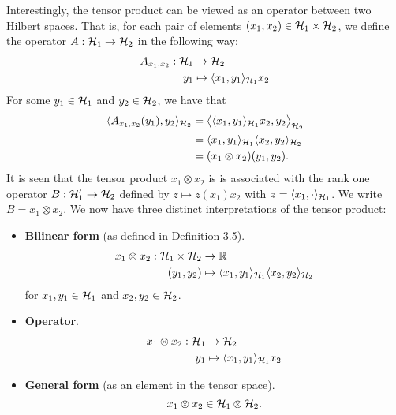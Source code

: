 Interestingly, the tensor product can be viewed as an operator between two Hilbert spaces.
That is, for each pair of elements $(x_1,x_2) \in {\mathcal H}_1\times{\mathcal H}_2$, we define the operator $A:{\mathcal H}_1\to{\mathcal H}_2$ in the following way:
\begin{align*}
  A_{x_1,x_2}:{\mathcal H}_1&\to{\mathcal H}_2 \\
  y_1&\mapsto \langle x_1,y_1\rangle_{{\mathcal H}_1}x_2
\end{align*}
For some $y_1\in{\mathcal H}_1$ and $y_2\in{\mathcal H}_2$, we have that
\begin{align*}
  \langle A_{x_1,x_2}(y_1),y_2\rangle_{{\mathcal H}_2} 
  &= \big\langle \langle x_1,y_1\rangle_{{\mathcal H}_1}x_2 , y_2 \big\rangle_{{\mathcal H}_2} \\
  &= \langle x_1,y_1\rangle_{{\mathcal H}_1}\langle x_2,y_2\rangle_{{\mathcal H}_2} \\
  &= (x_1\otimes x_2)(y_1,y_2).
\end{align*}
It is seen that the tensor product $x_1\otimes x_2$ is is associated with the rank one operator $B:{\mathcal H}_1'\to{\mathcal H}_2$ defined by $z \mapsto z(x_1)x_2$ with $z = \langle x_1,\cdot\rangle_{{\mathcal H}_1}$.
We write $B = x_1 \otimes x_2$.
We now have three distinct interpretations of the tensor product:
\begin{itemize}
  \item \textbf{Bilinear form} (as defined in Definition 3.5). 
  \begin{align*}
    x_1 \otimes x_2:{\mathcal H}_1 \times {\mathcal H}_2 &\to \mathbb{R} \\
    (y_1,y_2) &\mapsto \langle x_1,y_1\rangle_{{\mathcal H}_1}\langle x_2,y_2\rangle_{{\mathcal H}_2}
  \end{align*}
  for $x_1,y_1\in{\mathcal H}_1$ and $x_2,y_2\in{\mathcal H}_2$.
  \item \textbf{Operator}.
  \begin{align*}
    x_1 \otimes x_2:{\mathcal H}_1 &\to {\mathcal H}_2 \\
    y_1 &\mapsto \langle x_1,y_1\rangle_{{\mathcal H}_1}x_2
  \end{align*}  
  \item \textbf{General form} (as an element in the tensor space).
  \[
    x_1 \otimes x_2 \in {\mathcal H}_1 \otimes {\mathcal H}_2.
  \]
\end{itemize}

